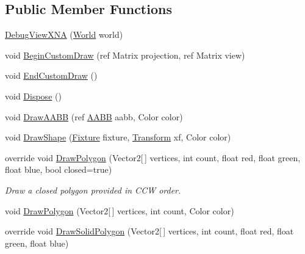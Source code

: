\subsection*{Public Member Functions}
\begin{DoxyCompactItemize}
\item 
\hyperlink{class_farseer_physics_1_1_debug_views_1_1_debug_view_x_n_a_ab17b6f0568ba96ae47a0aab19e3c28cd}{Debug\+View\+X\+N\+A} (\hyperlink{class_farseer_physics_1_1_dynamics_1_1_world}{World} world)
\item 
void \hyperlink{class_farseer_physics_1_1_debug_views_1_1_debug_view_x_n_a_ae4549e7b49ab1b86d12892c2a96c5709}{Begin\+Custom\+Draw} (ref Matrix projection, ref Matrix view)
\item 
void \hyperlink{class_farseer_physics_1_1_debug_views_1_1_debug_view_x_n_a_a317d0626aaa12f0a728908d099805ad5}{End\+Custom\+Draw} ()
\item 
void \hyperlink{class_farseer_physics_1_1_debug_views_1_1_debug_view_x_n_a_acce3501b8b55204d7c5dcb5087439365}{Dispose} ()
\item 
void \hyperlink{class_farseer_physics_1_1_debug_views_1_1_debug_view_x_n_a_a5a7c8f51c60d37c6f8afa9e9935cc4fa}{Draw\+A\+A\+B\+B} (ref \hyperlink{struct_farseer_physics_1_1_collision_1_1_a_a_b_b}{A\+A\+B\+B} aabb, Color color)
\item 
void \hyperlink{class_farseer_physics_1_1_debug_views_1_1_debug_view_x_n_a_aecb5a9cfc6e23f4c9b13a7338b8f214d}{Draw\+Shape} (\hyperlink{class_farseer_physics_1_1_dynamics_1_1_fixture}{Fixture} fixture, \hyperlink{struct_farseer_physics_1_1_common_1_1_transform}{Transform} xf, Color color)
\item 
override void \hyperlink{class_farseer_physics_1_1_debug_views_1_1_debug_view_x_n_a_af4a1beb3a718fab044de65978ae42d72}{Draw\+Polygon} (Vector2\mbox{[}$\,$\mbox{]} vertices, int count, float red, float green, float blue, bool closed=true)
\begin{DoxyCompactList}\small\item\em Draw a closed polygon provided in C\+C\+W order. \end{DoxyCompactList}\item 
void \hyperlink{class_farseer_physics_1_1_debug_views_1_1_debug_view_x_n_a_a525aef903a50647ef357c7cbda053b21}{Draw\+Polygon} (Vector2\mbox{[}$\,$\mbox{]} vertices, int count, Color color)
\item 
override void \hyperlink{class_farseer_physics_1_1_debug_views_1_1_debug_view_x_n_a_a8f354de1d08a4238c08bf5517cd4edd9}{Draw\+Solid\+Polygon} (Vector2\mbox{[}$\,$\mbox{]} vertices, int count, float red, float green, float blue)

\end{DoxyCompactItemize}
